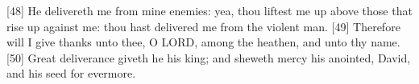 [48] \textcolor[cmyk]{0.99998,1,0,0}{He delivereth me from mine enemies: yea, thou liftest me up above those that rise up against me: thou hast delivered me from the violent man.}
[49] \textcolor[cmyk]{0.99998,1,0,0}{Therefore will I give thanks unto thee, O LORD, among the heathen, and  unto thy name.}
[50] \textcolor[cmyk]{0.99998,1,0,0}{Great deliverance giveth he  his king; and sheweth mercy  his anointed,  David, and  his seed for evermore.}






